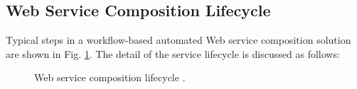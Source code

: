 \subsection{Web Service Composition Lifecycle}\label{lifecycle}
Typical steps in a workflow-based automated Web service composition solution are shown in Fig. \ref{fig:lifecycle}. The detail of the service lifecycle is discussed as follows:

\begin{figure}
\centerline{
}
\caption{ Web service composition lifecycle \cite{moghaddam2014service}.}
\label{fig:lifecycle}
\end{figure}


